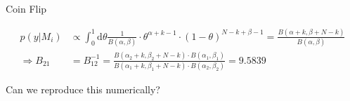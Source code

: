 \documentclass[11pt,aspectratio=1610,dvipsnames]{beamer}
\begin{document}
\begin{frame}{Coin Flip}
	\begin{tcolorbox}[colback=black!5,colframe=gray!15!black,title=Finally computing the \textsc{Bayes} factor]
		\begin{align*}
		p(y|M_i)&\propto \int_{0}^{1} \text{d}\theta \frac{1}{B(\alpha,\beta)} \cdot \theta^{\alpha+k-1}\cdot (1-\theta)^{N-k+\beta-1}
		=\frac{B(\alpha+k,\beta+N-k)}{B(\alpha, \beta)}\\
		\Rightarrow B_{21}&=B_{12}^{-1}=\frac{B(\alpha_2+k,\beta_2+N-k)\cdot B(\alpha_1,\beta_1)}{B(\alpha_1+k,\beta_1+N-k)\cdot B(\alpha_2,\beta_2)}=9.5839
		\end{align*}
	\end{tcolorbox}
Can we reproduce this numerically?

\vspace{1cm}

\raggedleft
\citet{PyMC3_BF}
\end{frame}
\end{document}
